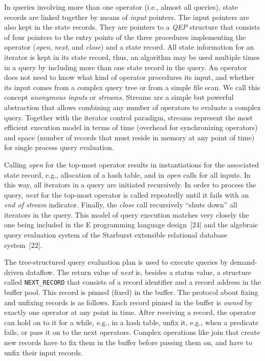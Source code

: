 \documentclass[a4paper,11pt,notitlepage,twoside,openright]{article}
\begin{document}
In queries involving more than one operator (i.e.,
almost all queries), state records are linked together by
means of \emph{input} pointers. The input pointers are also kept
in the state records. They are pointers to a \emph{QEP} structure
that consists of four pointers to the entry points of the
three procedures implementing the operator (\emph{open}, \emph{next}, and
\emph{close}) and a state record. All state information for an
iterator is kept in its state record, thus, an algorithm may
be used multiple times in a query by including more than
one state record in the query. An operator does not need
to know what kind of operator procedures its input, and
whether its input comes from a complex query tree or from
a simple file scan. We call this concept \emph{anonymous inputs}
or \emph{streams}. Streams are a simple but powerful abstraction
that allows combining any number of operators to evaluate
a complex query. Together with the iterator control paradigm,
streams represent the most efficient execution model
in terms of time (overhead for synchronizing operators) and
space (number of records that must reside in memory at
any point of time) for single process query evaluation.

Calling \emph{open} for the top-most operator results in
instantiations for the associated state record, e.g., allocation
of a hash table, and in \emph{open} calls for all inputs. In this
way, all iterators in a query are initiated recursively. In
order to process the query, \emph{next} for the top-most operator is
called repeatedly until it fails with an \emph{end of stream} indicator.
Finally, the \emph{close} call recursively ``shuts down'' all
iterators in the query. This model of query execution
matches very closely the one being included in the E programming
language design~{[24]} and the algebraic query
evaluation system of the Starburst extensible relational database system~{[22]}.

The tree-structured query evaluation plan is used to
execute queries by demand-driven dataflow. The return
value of \emph{next} is, besides a status value, a structure called
\texttt{NEXT\_RECORD} that consists of a record identifier and a
record address in the buffer pool. This record is pinned
(fixed) in the buffer. The protocol about fixing and unfixing
records is as follows. Each record pinned in the buffer
is \emph{owned} by exactly one operator at any point in time.
After receiving a record, the operator can hold on to it for
a while, e.g., in a hash table, unfix it, e.g., when a predicate
fails, or pass it on to the next operators. Complex
operations like join that create new records have to fix
them in the buffer before passing them on, and have to
unfix their input records.
\end{document}
